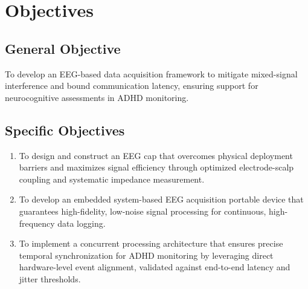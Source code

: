 \section{Objectives}

\subsection{General Objective}
To develop an EEG-based data acquisition framework to mitigate mixed-signal interference and bound communication latency, ensuring support for neurocognitive assessments in ADHD monitoring.

\subsection{Specific Objectives}
\begin{enumerate}
    \item To design and construct an EEG cap that overcomes physical deployment barriers and maximizes signal efficiency through optimized electrode-scalp coupling and systematic impedance measurement.
    \item To develop an embedded system-based EEG acquisition portable device that guarantees high-fidelity, low-noise signal processing for continuous, high-frequency data logging.
    \item To implement a concurrent processing architecture that ensures precise temporal synchronization for ADHD monitoring by leveraging direct hardware-level event alignment, validated against end-to-end latency and jitter thresholds.
\end{enumerate}
